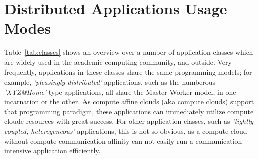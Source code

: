 \documentclass{article}
\newcommand{\I}[1]{\textit{#1}}
\begin{document}
\section{Distributed Applications Usage Modes}
\label{sec:apps}

 Table~\ref{tab:classes} shows an overview over a number of
 application classes which are widely used in the academic computing
 community, and outside.  Very frequently, applications in these
 classes share the same programming models; for example, \I{'pleasingly
 distributed'} applications, such as the numberous \I{'XYZ@Home'} type
 applications, all share the Master-Worker model, in one incarnation
 or the other.  As compute affine clouds (aka compute clouds) support
 that programming paradigm, these applications can immediately utilize
 compute cloude resources with great success.  For other application
 classes, such as \I{'tightly coupled, heterogeneous'} applications,
 this is not so obvious, as a compute cloud without
 compute-communication affinity can not easily run a communication
 intensive application efficiently.
 
\end{document}
